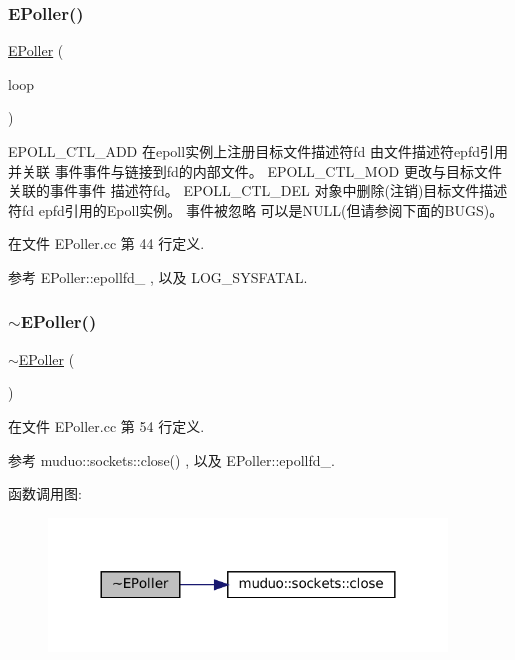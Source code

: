 \subsubsection{\texorpdfstring{E\+Poller()}{EPoller()}}
{\footnotesize\ttfamily \hyperlink{classmuduo_1_1EPoller}{E\+Poller} (\begin{DoxyParamCaption}\item[{\hyperlink{classmuduo_1_1EventLoop}{Event\+Loop} $\ast$}]{loop }\end{DoxyParamCaption})}

E\+P\+O\+L\+L\+\_\+\+C\+T\+L\+\_\+\+A\+DD 在epoll实例上注册目标文件描述符fd 由文件描述符epfd引用并关联 事件事件与链接到fd的内部文件。 E\+P\+O\+L\+L\+\_\+\+C\+T\+L\+\_\+\+M\+OD 更改与目标文件关联的事件事件 描述符fd。 E\+P\+O\+L\+L\+\_\+\+C\+T\+L\+\_\+\+D\+EL 对象中删除(注销)目标文件描述符fd epfd引用的\+Epoll实例。 事件被忽略 可以是\+N\+U\+LL(但请参阅下面的\+B\+U\+GS)。 

在文件 E\+Poller.\+cc 第 44 行定义.



参考 E\+Poller\+::epollfd\+\_\+ , 以及 L\+O\+G\+\_\+\+S\+Y\+S\+F\+A\+T\+AL.

\mbox{\label{classmuduo_1_1EPoller_aca4e8d4bd83557de60a7bf8523299deb}} 
\subsubsection{\texorpdfstring{$\sim$\+E\+Poller()}{~EPoller()}}
{\footnotesize\ttfamily $\sim$\hyperlink{classmuduo_1_1EPoller}{E\+Poller} (\begin{DoxyParamCaption}{ }\end{DoxyParamCaption})}



在文件 E\+Poller.\+cc 第 54 行定义.



参考 muduo\+::sockets\+::close() , 以及 E\+Poller\+::epollfd\+\_\+.

函数调用图\+:
\nopagebreak
\begin{figure}[H]
\begin{center}
\leavevmode
\includegraphics[width=300pt]{classmuduo_1_1EPoller_aca4e8d4bd83557de60a7bf8523299deb_cgraph}
\end{center}
\end{figure}


